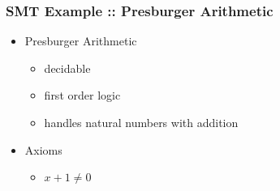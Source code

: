 
\begin{frame}

\frametitle{SMT Example :: Presburger Arithmetic}

\begin{itemize}

\item<1-> Presburger Arithmetic

\begin{itemize}

\item decidable

\item first order logic

\item handles natural numbers with addition

\end{itemize}

\item<2-> Axioms

\begin{itemize}

\item $x + 1 \neq 0$


\end{itemize}
\end{itemize}
\end{frame}
